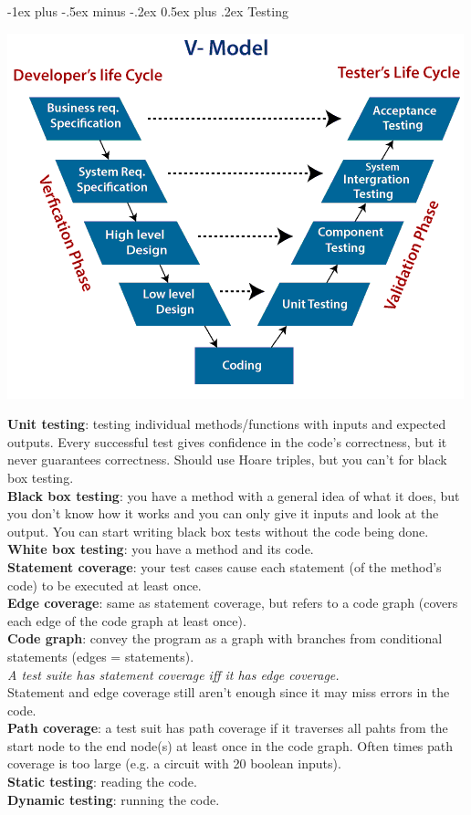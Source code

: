 \documentclass[10pt,landscape]{article}
\makeatletter
\renewcommand{\section}{\@startsection{section}{1}{0mm}%
                                {-1ex plus -.5ex minus -.2ex}%
                                {0.5ex plus .2ex}%
                                {\normalfont\large\bfseries}}
\makeatother
\begin{document}
\begin{multicols}{3}
\section{Testing}
{\centering\includegraphics[scale=0.3]{img/V-model.png}\par}
\textbf{Unit testing}: testing individual methods/functions with inputs and expected outputs. Every successful test gives confidence in the code's correctness, but it never guarantees correctness. Should use Hoare triples, but you can't for black box testing.\\
\textbf{Black box testing}: you have a method with a general idea of what it does, but you don't know how it works and you can only give it inputs and look at the output. You can start writing black box tests without the code being done.\\
\textbf{White box testing}: you have a method and its code.\\
\textbf{Statement coverage}: your test cases cause each statement (of the method's code) to be executed at least once.\\
\textbf{Edge coverage}: same as statement coverage, but refers to a code graph (covers each edge of the code graph at least once).\\
\textbf{Code graph}: convey the program as a graph with branches from conditional statements (edges = statements).\\
\textit{A test suite has statement coverage iff it has edge coverage.}\\
Statement and edge coverage still aren't enough since it may miss errors in the code.\\
\textbf{Path coverage}: a test suit has path coverage if it traverses all pahts from the start node to the end node(s) at least once in the code graph. Often times path coverage is too large (e.g. a circuit with 20 boolean inputs).\\
\textbf{Static testing}: reading the code.\\
\textbf{Dynamic testing}: running the code.

\end{multicols}
\end{document}
